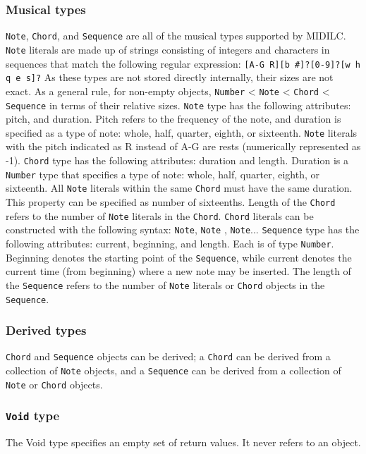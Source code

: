 \documentclass[12pt,A4]{book}
\begin{document}
\subsubsection{Musical types}
\verb|Note|, \verb|Chord|, and \verb|Sequence| are all of the musical types supported by MIDILC. \verb|Note| literals are  made up of strings consisting of integers and characters in sequences that match the following regular expression:
\verb|[A-G R][b #]?[0-9]?[w h q e s]?|
As these types are not stored directly internally, their sizes are not exact. As a general rule, for non-empty objects,
\verb|Number| < \verb|Note| < \verb|Chord| < \verb|Sequence| in terms of their relative sizes.
\verb|Note| type has the following attributes: pitch, and duration. Pitch refers to the frequency of the note, and duration is specified as a type of note: whole, half, quarter, eighth, or sixteenth.  \verb|Note| literals with the pitch indicated as R instead of A-G are rests (numerically represented as -1).
\verb|Chord| type has the following attributes: duration and length. Duration is a \verb|Number| type that specifies a type of note: whole, half, quarter, eighth, or sixteenth. All \verb|Note| literals within the same \verb|Chord| must have the same duration.  This property can be specified as number of sixteenths. Length of the \verb|Chord| refers to the number of \verb|Note| literals in the \verb|Chord|.
\verb|Chord| literals can be constructed with the following syntax:
{ \verb|Note|,  \verb|Note| , \verb|Note|... }
\verb|Sequence| type has the following attributes: current, beginning, and length. Each is of type \verb|Number|. Beginning denotes the starting point of the \verb|Sequence|, while current denotes the current time (from beginning) where a new note may be inserted. The length of the \verb|Sequence| refers to the number of \verb|Note| literals or \verb|Chord| objects in the \verb|Sequence|.
\subsubsection{Derived types}
\verb|Chord| and \verb|Sequence| objects can be derived; a \verb|Chord| can be derived from a collection of \verb|Note| objects, and a \verb|Sequence| can be derived from a collection of \verb|Note| or \verb|Chord| objects.
\subsubsection{\verb|Void| type}
The Void type specifies an empty set of return values. It never refers to an object.
\end{document}
